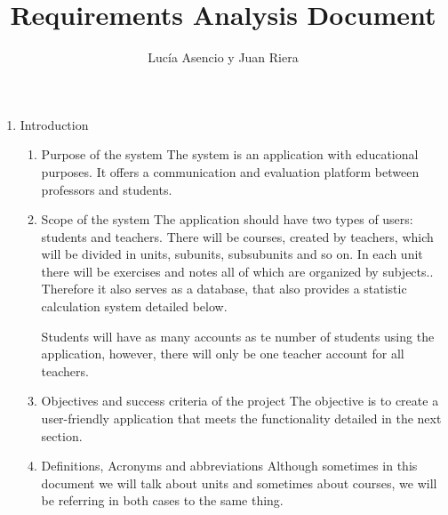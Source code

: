 \documentclass{article}
\title{Requirements Analysis Document}
\author{Lucía Asencio y Juan Riera}
\begin{document}
\maketitle
\begin{enumerate}
	\item{Introduction}
	\begin{enumerate}
		\item{Purpose of the system}
		The system is an application with educational purposes. It offers a communication and evaluation platform between professors and students.
		\item{Scope of the system}
		The application should have two types of users: students and teachers. There will be courses, created by teachers, which will be divided in units, subunits, subsubunits and so on. In each unit there will be exercises and notes all of which are organized by subjects.. Therefore it also serves as a database, that also provides a statistic calculation system detailed below.
		
		Students will have as many accounts as te number of students using the application, however, there will only be one teacher account for all teachers.
		\item{Objectives and success criteria of the project}
		The objective is to create a user-friendly application that meets the functionality detailed in the next section.
		\item{Definitions, Acronyms and abbreviations}
		Although sometimes in this document we will talk about units and sometimes about courses, we will be referring in both cases to the same thing.
	\end{enumerate}
	

\end{enumerate}
\end{document}
